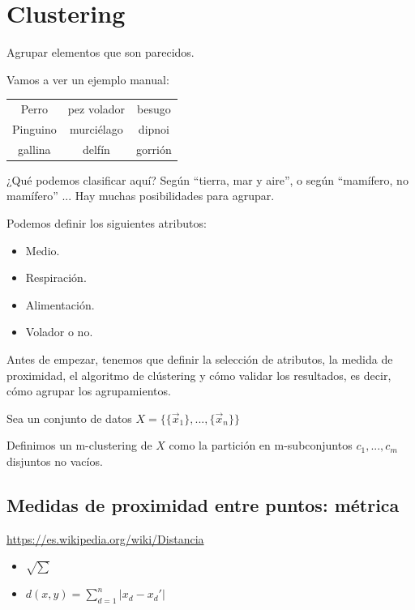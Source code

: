 \documentclass{apuntes}
\begin{document}
\chapter{Clustering}

Agrupar elementos que son parecidos.

Vamos a ver un ejemplo manual:

\begin{center}
\begin{tabular}{ccc}
Perro & pez volador & besugo \\
Pinguino & murciélago & dipnoi\\
gallina & delfín & gorrión
\end{tabular}
\end{center}


¿Qué podemos clasificar aquí? Según ``tierra, mar y aire'', o según ``mamífero, no mamífero'' ... Hay muchas posibilidades para agrupar.

Podemos definir los siguientes atributos: 

\begin{itemize}
	\item Medio.
	\item Respiración.
	\item Alimentación.
	\item Volador o no.
\end{itemize}

Antes de empezar, tenemos que definir la selección de atributos, la medida de proximidad, el algoritmo de clústering y cómo validar los resultados, es decir, cómo agrupar los agrupamientos.

\begin{defn}[m-clústering]
Sea un conjunto de datos $X = \{\{\vec{x}_1\},...,\{\vec{x}_n\}\}$

Definimos un m-clustering de $X$ como la partición en m-subconjuntos $c_1,...,c_m$ disjuntos no vacíos.

\end{defn}

\section{Medidas de proximidad entre puntos: métrica}

\begin{defn}[Métrica]
\href{https://es.wikipedia.org/wiki/Distancia}{https://es.wikipedia.org/wiki/Distancia}
\end{defn}

\begin{itemize}
	\item {} $\sqrt{\sum}$
	\item {} $d(x,y) = \sum_{d=1}^n |x_d - x_d'|$
\end{itemize}
\end{document}
